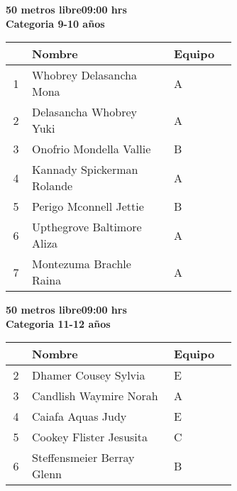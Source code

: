 \begin{minipage}{0.95\linewidth}\vspace{0.5cm} 
\begin{flushleft}
\textbf{
\hspace{-0.15cm}50 metros libre\hspace{1.5cm}09:00 hrs \\Categoria 9-10 años}\vspace{-0.2cm} 
\end{flushleft}
\begin{tabular}{cp{0.63\linewidth}l}
\hline
& \textbf{Nombre} & \textbf{Equipo} \\ \hline
1 & Whobrey Delasancha Mona & A \\ 
2 & Delasancha Whobrey Yuki & A \\ 
3 & Onofrio Mondella Vallie & B \\ 
4 & Kannady Spickerman Rolande & A \\ 
5 & Perigo Mconnell Jettie & B \\ 
6 & Upthegrove Baltimore Aliza & A \\ 
7 & Montezuma Brachle Raina & A \\ 
\end{tabular}
\end{minipage}
\begin{minipage}{0.95\linewidth}\vspace{0.5cm} 
\begin{flushleft}
\textbf{
\hspace{-0.15cm}50 metros libre\hspace{1.5cm}09:00 hrs \\Categoria 11-12 años}\vspace{-0.2cm} 
\end{flushleft}
\begin{tabular}{cp{0.63\linewidth}l}
\hline
& \textbf{Nombre} & \textbf{Equipo} \\ \hline
2 & Dhamer Cousey Sylvia & E \\ 
3 & Candlish Waymire Norah & A \\ 
4 & Caiafa Aquas Judy & E \\ 
5 & Cookey Flister Jesusita & C \\ 
6 & Steffensmeier Berray Glenn & B \\ 
\end{tabular}
\end{minipage}
